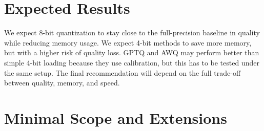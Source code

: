 \documentclass[11pt,a4paper]{article}
\begin{document}

\section{Expected Results}

We expect 8-bit quantization to stay close to the full-precision baseline in quality while reducing memory usage. We expect 4-bit methods to save more memory, but with a higher risk of quality loss. GPTQ and AWQ may perform better than simple 4-bit loading because they use calibration, but this has to be tested under the same setup. The final recommendation will depend on the full trade-off between quality, memory, and speed.



\section{Minimal Scope and Extensions}
\end{document}
